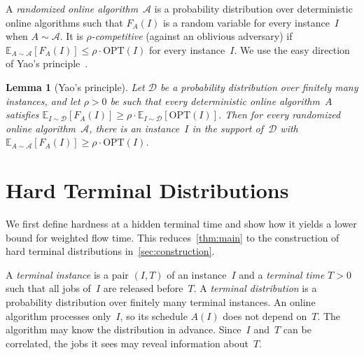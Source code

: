 \documentclass[11pt,letterpaper]{article}
\newtheorem{lemma}[theorem]{Lemma}
\theoremstyle{definition}
\theoremstyle{remark}
\newcommand{\OPT}{{\mathrm{OPT}}}
\newcommand{\E}{\mathbb{E}}
\newcommand{\cD}{\mathcal{D}}
\newcommand{\cA}{\mathcal{A}}
\begin{document}
A \emph{randomized online algorithm}~$\cA$ is a probability distribution over deterministic online algorithms such that $F_A(I)$ is a random variable for every instance~$I$ when $A\sim\cA$. It is \emph{$\rho$-competitive} (against an oblivious adversary) if $\E_{A\sim\cA}[F_A(I)]\le \rho\cdot\OPT(I)$ for every instance~$I$. We use the easy direction of Yao's principle~\cite{Yao77}.


\begin{lemma}[Yao's principle]\label{lem:yao}
Let $\cD$ be a probability distribution over finitely many instances, and let $\rho>0$ be such that every deterministic online algorithm~$A$ satisfies $\E_{I\sim\cD}[F_A(I)]\ge \rho\cdot\E_{I\sim\cD}[\OPT(I)]$. Then for every randomized online algorithm~$\cA$, there is an instance~$I$ in the support of~$\cD$ with $\E_{A\sim\cA}[F_A(I)]\ge \rho\cdot\OPT(I)$.
\end{lemma}




\section{Hard Terminal Distributions}\label{sec:hard}

We first define hardness at a hidden terminal time and show how it yields a lower bound for weighted flow time. This reduces~\cref{thm:main} to the construction of hard terminal distributions in~\cref{sec:construction}.


A \emph{terminal instance} is a pair $(I,T)$ of an instance~$I$ and a \emph{terminal time} $T>0$ such that all jobs of~$I$ are released before~$T$. A \emph{terminal distribution} is a probability distribution over finitely many terminal instances. An online algorithm processes only~$I$, so its schedule $A(I)$ does not depend on~$T$. The algorithm may know the distribution in advance. Since~$I$ and~$T$ can be correlated, the jobs it sees may reveal information about~$T$.
\end{document}
